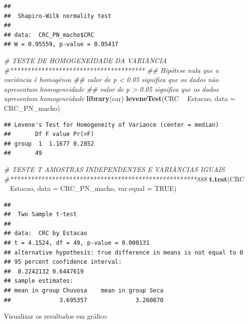 \documentclass[
]{book}
\newenvironment{Shaded}{\begin{snugshade}}{\end{snugshade}}
\newcommand{\CommentTok}[1]{\textcolor[rgb]{0.56,0.35,0.01}{\textit{#1}}}
\newcommand{\DataTypeTok}[1]{\textcolor[rgb]{0.13,0.29,0.53}{#1}}
\newcommand{\KeywordTok}[1]{\textcolor[rgb]{0.13,0.29,0.53}{\textbf{#1}}}
\newcommand{\NormalTok}[1]{#1}
\newcommand{\OperatorTok}[1]{\textcolor[rgb]{0.81,0.36,0.00}{\textbf{#1}}}
\newcommand{\OtherTok}[1]{\textcolor[rgb]{0.56,0.35,0.01}{#1}}
\newcommand{\StringTok}[1]{\textcolor[rgb]{0.31,0.60,0.02}{#1}}
\begin{document}
\begin{verbatim}
## 
## 	Shapiro-Wilk normality test
## 
## data:  CRC_PN_macho$CRC
## W = 0.95559, p-value = 0.05417
\end{verbatim}

\begin{Shaded}
\begin{Highlighting}[]
\CommentTok{# TESTE DE HOMOGENEIDADE DA VARIÂNCIA}
\CommentTok{#***************************************}
\CommentTok{## Hipótese nula que a variância é homogênea}
\CommentTok{## valor de p < 0.05 significa que os dados não apresentam homogeneidade}
\CommentTok{## valor de p > 0.05 significa que os dados apresentam homogeneidade}
\KeywordTok{library}\NormalTok{(car)}
\KeywordTok{leveneTest}\NormalTok{(CRC }\OperatorTok{~}\StringTok{ }\NormalTok{Estacao, }\DataTypeTok{data =}\NormalTok{ CRC_PN_macho)}
\end{Highlighting}
\end{Shaded}

\begin{verbatim}
## Levene's Test for Homogeneity of Variance (center = median)
##       Df F value Pr(>F)
## group  1  1.1677 0.2852
##       49
\end{verbatim}

\begin{Shaded}
\begin{Highlighting}[]
\CommentTok{# TESTE T AMOSTRAS INDEPENDENTES E VARIÂNCIAS IGUAIS}
\CommentTok{#******************************************************888}
\KeywordTok{t.test}\NormalTok{(CRC }\OperatorTok{~}\StringTok{ }\NormalTok{Estacao, }\DataTypeTok{data =}\NormalTok{ CRC_PN_macho, }\DataTypeTok{var.equal =} \OtherTok{TRUE}\NormalTok{)}
\end{Highlighting}
\end{Shaded}

\begin{verbatim}
## 
## 	Two Sample t-test
## 
## data:  CRC by Estacao
## t = 4.1524, df = 49, p-value = 0.000131
## alternative hypothesis: true difference in means is not equal to 0
## 95 percent confidence interval:
##  0.2242132 0.6447619
## sample estimates:
## mean in group Chuvosa    mean in group Seca 
##              3.695357              3.260870
\end{verbatim}

Visualizar os resultados em gráfico
\end{document}
